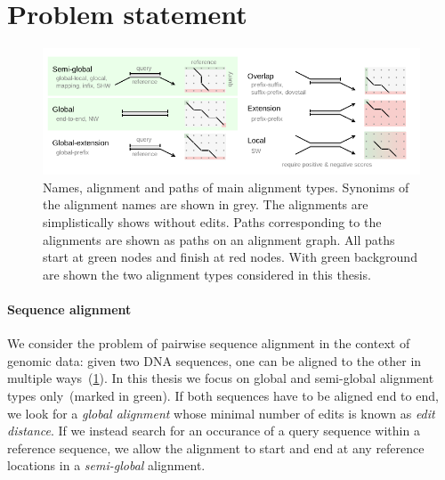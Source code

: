 \section*{Problem statement}

\begin{figure}[t]  %
    \includegraphics[width=\textwidth]{alignment-types-thesis.pdf}
	\caption[Main alignment types]{Names, alignment and paths of main alignment
    types. Synonims of the alignment names are shown in grey. The alignments are
    simplistically shows without edits. Paths corresponding to the alignments
    are shown as paths on an alignment graph. All paths start at green nodes and
    finish at red nodes. With green background are shown the two alignment types
    considered in this thesis.}
    \label{fig:alignment-types}
\end{figure}

\paragraph{Sequence alignment}
We consider the problem of pairwise sequence alignment in the context of genomic
data: given two DNA sequences, one can be aligned to the other in multiple
ways~(\cref{fig:alignment-types}). In this thesis we focus on global and
semi-global alignment types only~(marked in green). If both sequences have to be
aligned end to end, we look for a \emph{global alignment} whose minimal number
of edits is known as \emph{edit distance}. If we instead search for an occurance
of a query sequence within a reference sequence, we allow the alignment to start
and end at any reference locations in a \emph{semi-global} alignment.


